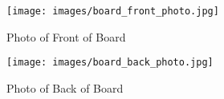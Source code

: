 \begin{figure}[!htb]
\centering
\texttt{[image: images/board\_front\_photo.jpg]}
\caption{Photo of Front of Board}
\label{fig:board_front_photo}
\end{figure}

\begin{figure}[!htb]
\centering
\texttt{[image: images/board\_back\_photo.jpg]}
\caption{Photo of Back of Board}
\label{fig:board_back_photo}
\end{figure}
